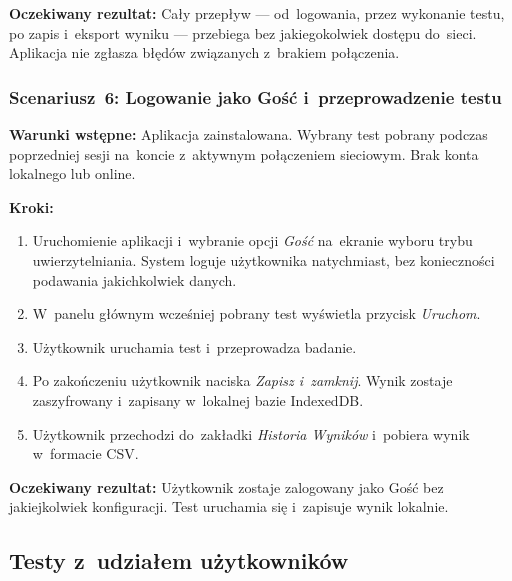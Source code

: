 \documentclass[12pt, a4paper, oneside]{report}
\begin{document}
\textbf{Oczekiwany rezultat:} Cały przepływ --- od~logowania, przez wykonanie testu,
po zapis i~eksport wyniku --- przebiega bez jakiegokolwiek dostępu do~sieci.
Aplikacja nie zgłasza błędów związanych z~brakiem połączenia.

\subsubsection*{Scenariusz~6: Logowanie jako Gość i~przeprowadzenie testu}
\label{scen:6}

\textbf{Warunki wstępne:} Aplikacja zainstalowana. Wybrany test pobrany podczas
poprzedniej sesji na~koncie z~aktywnym połączeniem sieciowym. Brak konta lokalnego
lub online.

\textbf{Kroki:}
\begin{enumerate}[noitemsep]
	\item Uruchomienie aplikacji i~wybranie opcji \textit{Gość} na~ekranie wyboru
	      trybu uwierzytelniania. System loguje użytkownika natychmiast, bez
	      konieczności podawania jakichkolwiek danych.
	\item W~panelu głównym wcześniej pobrany test wyświetla przycisk \textit{Uruchom}.
	\item Użytkownik uruchamia test i~przeprowadza badanie.
	\item Po zakończeniu użytkownik naciska \textit{Zapisz i~zamknij}. Wynik zostaje
	      zaszyfrowany i~zapisany w~lokalnej bazie IndexedDB.
	\item Użytkownik przechodzi do~zakładki \textit{Historia Wyników} i~pobiera
	      wynik w~formacie CSV.
\end{enumerate}

\textbf{Oczekiwany rezultat:} Użytkownik zostaje zalogowany jako Gość bez
jakiejkolwiek konfiguracji. Test uruchamia się i~zapisuje wynik lokalnie.

\subsection{Testy z~udziałem użytkowników}
\label{subsec:testy-user}

\end{document}
